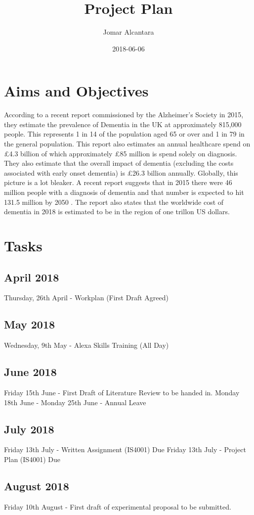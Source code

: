 \documentclass[a4paper]{article}
\title{Project Plan}
\date{2018-06-06}
\author{Jomar Alcantara}
\begin{document}
\section{Aims and Objectives}
According to a recent report commissioned by the Alzheimer's Society in 2015, they estimate the prevalence of Dementia in the UK at approximately 815,000 people. This represents 1 in 14 of the population aged 65 or over and 1 in 79 in the general population. This report also estimates an annual healthcare spend on £4.3 billion of which approximately £85 million is spend solely on diagnosis. They also estimate that the overall impact of dementia (excluding the costs associated with early onset dementia) is £26.3 billion annually. Globally, this picture is a lot bleaker. A recent report suggests that in 2015 there were 46 million people with a diagnosis of dementia and that number is expected to hit 131.5 million by 2050 \cite{Prince2015}. The report also states that the worldwide cost of dementia in 2018 is estimated to be in the region of one trillon US dollars. \newline
\section{Tasks}
	\subsection{April 2018}
	Thursday, 26th April - Workplan (First Draft Agreed)
	\subsection{May 2018}
	Wednesday, 9th May - Alexa Skills Training (All Day)
	\subsection{June 2018}
	Friday 15th June - First Draft of Literature Review to be handed in.
	\newline
	Monday 18th June - Monday 25th June - Annual Leave
	\subsection{July 2018}
	Friday 13th July - Written Assignment (IS4001) Due
	Friday 13th July - Project Plan (IS4001) Due
	
	\subsection{August 2018}
	Friday 10th August - First draft of experimental proposal to be submitted.
	
\end{document}
